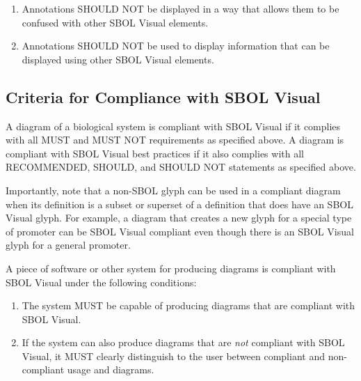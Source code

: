 \begin{enumerate}
\item Annotations SHOULD NOT be displayed in a way that allows them to be confused with other SBOL Visual elements.
\item Annotations SHOULD NOT be used to display information that can be displayed using other SBOL Visual elements.
\end{enumerate}

\subsection{Criteria for Compliance with SBOL Visual}

A diagram of a biological system is compliant with SBOL Visual if it complies with all MUST and MUST NOT requirements as specified above.
A diagram is compliant with SBOL Visual best practices if it also complies with all RECOMMENDED, SHOULD, and SHOULD NOT statements as specified above.

Importantly, note that a non-SBOL glyph can be used in a compliant
diagram when its definition is a subset or superset of a definition that
does have an SBOL Visual glyph.  For example, a diagram that creates a
new glyph for a special type of promoter can be SBOL Visual compliant
even though there is an SBOL Visual glyph for a general promoter.

A piece of software or other system for producing diagrams is
compliant with SBOL Visual under the following conditions:
\begin{enumerate}
\item The system MUST be capable of producing diagrams that are
  compliant with SBOL Visual.
\item If the system can also produce diagrams that are {\em not}
  compliant with SBOL Visual, it MUST clearly distinguish to the user
  between compliant and non-compliant usage and diagrams.
\end{enumerate}


